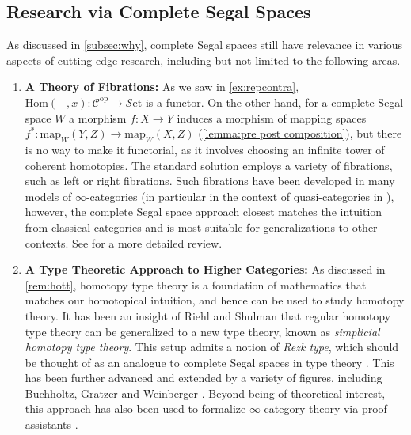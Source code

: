 \documentclass[11pt, a4paper]{amsart}
\newcommand{\cC}{\mathcal{C}}
\newcommand{\Hom}{\mathrm{Hom}}
\newcommand{\map}{\mathrm{map}}
\newcommand{\op}{\mathrm{op}}
\newcommand{\Set}{\mathscr{S}\mathrm{et}}
\theoremstyle{definition}
\theoremstyle{remark}
\numberwithin{equation}{section}
\begin{document}
\subsection{Research via Complete Segal Spaces}
As discussed in \cref{subsec:why}, complete Segal spaces still have relevance in various aspects of cutting-edge research, including but not limited to the following areas.
\begin{enumerate}[leftmargin=*]
  \item \textbf{A Theory of Fibrations:} As we saw in \cref{ex:repcontra}, $\Hom(-,x)\colon \cC^{\op} \to \Set$ is a functor. On the other hand, for a complete Segal space $W$ a morphism $f\colon X \to Y$ induces a morphism of mapping spaces $f^*\colon\map_W(Y,Z) \to \map_W(X,Z)$ (\cref{lemma:pre post composition}), but there is no way to make it functorial, as it involves choosing an infinite tower of coherent homotopies. The standard solution employs a variety of fibrations, such as left or right fibrations. Such fibrations have been developed in many models of $\infty$-categories (in particular in the context of quasi-categories in \cite{lurie2009htt}), however, the complete Segal space approach closest matches the intuition from classical categories and is most suitable for generalizations to other contexts. See \cite[Section 1, Subsection 2.1]{rasekh2023left} for a more detailed review.
  \item \textbf{A Type Theoretic Approach to Higher Categories:} As discussed in \cref{rem:hott}, homotopy type theory is a foundation of mathematics that matches our homotopical intuition, and hence can be used to study homotopy theory. It has been an insight of Riehl and Shulman that regular homotopy type theory \cite{hottbook2013} can be generalized to a new type theory, known as \emph{simplicial homotopy type theory}. This setup admits a notion of \emph{Rezk type}, which should be thought of as an analogue to complete Segal spaces in type theory \cite{riehlshulman2017rezktypes}. This has been further advanced and extended by a variety of figures, including Buchholtz, Gratzer and Weinberger \cite{buchholtzweinberger2023cartesianfibhott,weinberger2024twosidedcartfib,weinberger2024internalsums,weinberger2022exttype,weinberger2024chev,gratzerweinbergerebuchholtz2024diruniv,gratzerweinbergerebuchholtz2025yonedaemb,gratzerweinbergerebuchholtz2026infinitycatsimp,bardomianomartinez2025limitscolimits}. Beyond being of theoretical interest, this approach has also been used to formalize $\infty$-category theory via proof assistants \cite{kudasovriehlweinberger2024rzkyoneda}.

\end{enumerate}
\end{document}
